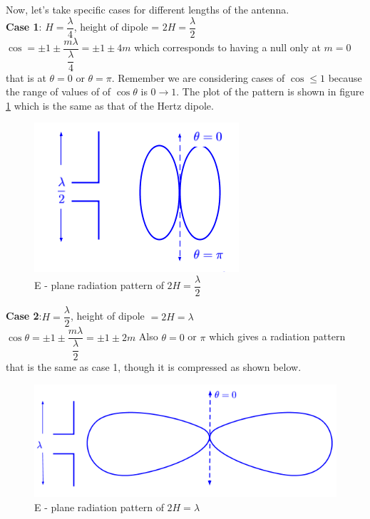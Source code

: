 Now, let's take specific cases for different lengths of the antenna.\\
\textbf{Case 1}: $H =\dfrac{\lambda}{4}$, height of dipole = $2H = \dfrac{\lambda}{2}$\\
$\cos = \pm1 \pm \dfrac{m\lambda}{\dfrac{\lambda}{4}} = \pm1 \pm 4m$ which corresponds to having a null only at $m = 0$ that is at $\theta = 0$ or $\theta = \pi$. Remember we are considering cases of $\cos\leq1$ because the range of values of of $\cos \theta$ is $0\rightarrow1$. The plot of the  pattern is shown in figure \ref{figure4} which is the same as that of the Hertz dipole.
\begin{figure}[h]
\centering
\includegraphics[width=1\linewidth]{"./graphics/fig 4 lec 10"}
\caption{E - plane radiation pattern of $2H = \dfrac{\lambda}{2}$}
\label{figure4}
\end{figure}

\textbf{Case 2}:$H = \dfrac{\lambda}{2}$, height of dipole $=2H =\lambda$\\
$\cos \theta = \pm 1 \pm \dfrac{m\lambda}{\dfrac{\lambda}{2}} = \pm 1 \pm 2m$
Also $\theta = 0$ or $\pi$ which gives a radiation pattern that is the same as case 1, though it is compressed as shown below. 
\begin{figure}[h]
\centering
\includegraphics[width=1\linewidth]{"./graphics/fig 5 lecture 10"}
\caption{E - plane radiation pattern of $2H = \lambda$}
\label{figure5}
\end{figure}

